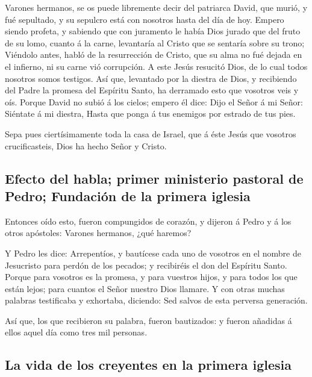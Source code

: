  Varones hermanos, se os puede libremente decir del
patriarca David, que murió, y fué sepultado, y su sepulcro está con
nosotros hasta del día de hoy.  Empero siendo profeta, y
sabiendo que con juramento le había Dios jurado que del fruto de su
lomo, cuanto á la carne, levantaría al Cristo que se sentaría sobre su
trono;  Viéndolo antes, habló de la resurrección de Cristo,
que su alma no fué dejada en el infierno, ni su carne vió corrupción.
 A este Jesús resucitó Dios, de lo cual todos nosotros
somos testigos.  Así que, levantado por la diestra de Dios,
y recibiendo del Padre la promesa del Espíritu Santo, ha derramado esto
que vosotros veis y oís.  Porque David no subió á los
cielos; empero él dice: Dijo el Señor á mi Señor: Siéntate á mi diestra,
 Hasta que ponga á tus enemigos por estrado de tus pies.

 Sepa pues ciertísimamente toda la casa de Israel, que á
éste Jesús que vosotros crucificasteis, Dios ha hecho Señor y Cristo.

\hypertarget{efecto-del-habla-primer-ministerio-pastoral-de-pedro-fundaciuxf3n-de-la-primera-iglesia}{%
\subsection{Efecto del habla; primer ministerio pastoral de Pedro;
Fundación de la primera
iglesia}\label{efecto-del-habla-primer-ministerio-pastoral-de-pedro-fundaciuxf3n-de-la-primera-iglesia}}

 Entonces oído esto, fueron compungidos de corazón, y
dijeron á Pedro y á los otros apóstoles: Varones hermanos, ¿qué haremos?

 Y Pedro les dice: Arrepentíos, y bautícese cada uno de
vosotros en el nombre de Jesucristo para perdón de los pecados; y
recibiréis el don del Espíritu Santo.  Porque para vosotros
es la promesa, y para vuestros hijos, y para todos los que están lejos;
para cuantos el Señor nuestro Dios llamare.  Y con otras
muchas palabras testificaba y exhortaba, diciendo: Sed salvos de esta
perversa generación.

 Así que, los que recibieron su palabra, fueron bautizados:
y fueron añadidas á ellos aquel día como tres mil personas.

\hypertarget{la-vida-de-los-creyentes-en-la-primera-iglesia}{%
\subsection{La vida de los creyentes en la primera
iglesia}\label{la-vida-de-los-creyentes-en-la-primera-iglesia}}

